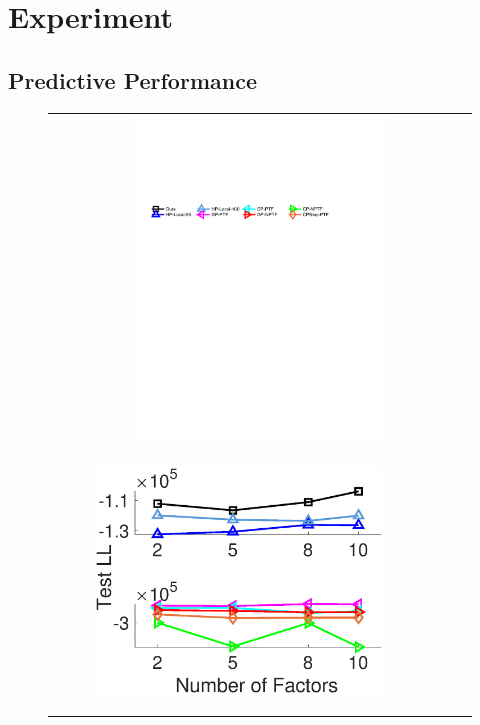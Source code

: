 \vspace{-0.25in}
\section{Experiment}
\vspace{-0.05in}
\subsection{Predictive Performance}
\vspace{-0.1in}
\begin{figure}
	\centering
	\setlength\tabcolsep{0.01pt}
	\begin{tabular}[c]{cccc}
		\multicolumn{4}{c}{\includegraphics[width=0.618\textwidth]{./figs/ll_legend.pdf}}
		\\
		\begin{subfigure}[t]{0.25\textwidth}
			\centering
			\includegraphics[width=\textwidth]{./figs/taobao_ll.eps}

\end{subfigure}
\end{tabular}
\end{figure}
